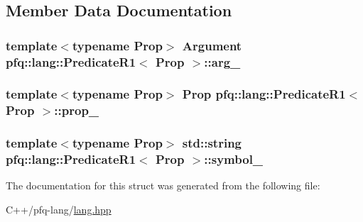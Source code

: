 \subsection{Member Data Documentation}
\hypertarget{structpfq_1_1lang_1_1PredicateR1_aa15aa97d87420b99efb16ad6c809d1ca}{
\subsubsection[{arg\+\_\+}]{\setlength{\rightskip}{0pt plus 5cm}template$<$typename Prop$>$ {\bf Argument} {\bf pfq\+::lang\+::\+Predicate\+R1}$<$ Prop $>$\+::arg\+\_\+}}\label{structpfq_1_1lang_1_1PredicateR1_aa15aa97d87420b99efb16ad6c809d1ca}
\hypertarget{structpfq_1_1lang_1_1PredicateR1_a20938f5576439dbf397db8fd8db122a7}{
\subsubsection[{prop\+\_\+}]{\setlength{\rightskip}{0pt plus 5cm}template$<$typename Prop$>$ Prop {\bf pfq\+::lang\+::\+Predicate\+R1}$<$ Prop $>$\+::prop\+\_\+}}\label{structpfq_1_1lang_1_1PredicateR1_a20938f5576439dbf397db8fd8db122a7}
\hypertarget{structpfq_1_1lang_1_1PredicateR1_abdd49bc4fb2fd76c60fefc79339858ec}{
\subsubsection[{symbol\+\_\+}]{\setlength{\rightskip}{0pt plus 5cm}template$<$typename Prop$>$ std\+::string {\bf pfq\+::lang\+::\+Predicate\+R1}$<$ Prop $>$\+::symbol\+\_\+}}\label{structpfq_1_1lang_1_1PredicateR1_abdd49bc4fb2fd76c60fefc79339858ec}


The documentation for this struct was generated from the following file\+:\begin{DoxyCompactItemize}
\item 
C++/pfq-\/lang/\hyperlink{lang_8hpp}{lang.\+hpp}\end{DoxyCompactItemize}
